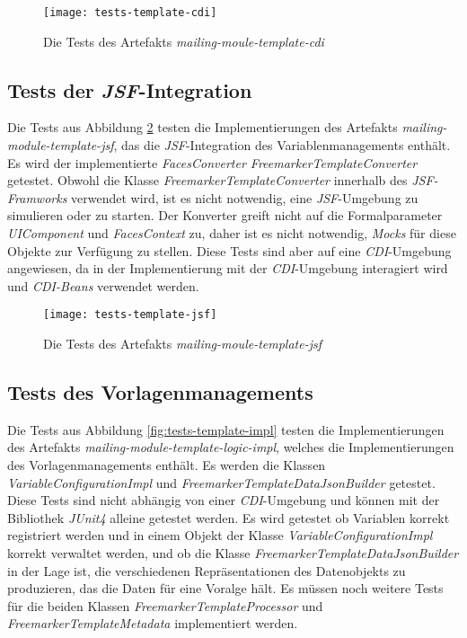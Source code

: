 \begin{figure}[h]
\centering
\texttt{[image: tests-template-cdi]}
\caption{Die Tests des Artefakts \emph{mailing-moule-template-cdi}}
\label{fig:tests-template-cdi}
\end{figure}

\subsection{Tests der \emph{JSF}-Integration}
Die Tests aus Abbildung \ref{fig:tests-template-jsf} testen die Implementierungen des Artefakts \emph{mailing-module-template-jsf}, das die \emph{JSF}-Integration des Variablenmanagements enthält. Es wird der implementierte \emph{FacesConverter FreemarkerTemplateConverter} getestet. Obwohl die Klasse \emph{FreemarkerTemplateConverter} innerhalb des \emph{JSF-Framworks} verwendet wird, ist es nicht notwendig, eine \emph{JSF}-Umgebung zu simulieren oder zu starten. Der Konverter greift nicht auf die Formalparameter \emph{UIComponent} und \emph{FacesContext} zu, daher ist es nicht notwendig, \emph{Mocks} für diese Objekte zur Verfügung zu stellen. Diese Tests sind aber auf eine \emph{CDI}-Umgebung angewiesen, da in der Implementierung mit der \emph{CDI}-Umgebung interagiert wird und \emph{CDI-Beans} verwendet werden.

\begin{figure}[h]
\centering
\texttt{[image: tests-template-jsf]}
\caption{Die Tests des Artefakts \emph{mailing-moule-template-jsf}}
\label{fig:tests-template-jsf}
\end{figure}

\subsection{Tests des Vorlagenmanagements}
Die Tests aus Abbildung \ref{fig:tests-template-impl} testen die Implementierungen des Artefakts \emph{mailing-module-template-logic-impl}, welches die Implementierungen des Vorlagenmanagements enthält. Es werden die Klassen \emph{VariableConfigurationImpl} und \emph{FreemarkerTemplateDataJsonBuilder}  getestet.
\newline
\newline
Diese Tests sind nicht abhängig von einer \emph{CDI}-Umgebung und können mit der Bibliothek \emph{JUnit4} alleine getestet werden. Es wird getestet ob Variablen korrekt registriert werden und in einem Objekt der Klasse \emph{VariableConfigurationImpl} korrekt verwaltet werden, und ob die Klasse \emph{FreemarkerTemplateDataJsonBuilder} in der Lage ist, die verschiedenen Repräsentationen des Datenobjekts zu produzieren, das die Daten für eine Voralge hält.
\newline
\newline
Es müssen noch weitere Tests für die beiden Klassen \emph{FreemarkerTemplateProcessor} und \emph{FreemarkerTemplateMetadata} 
implementiert werden.
\newpage

